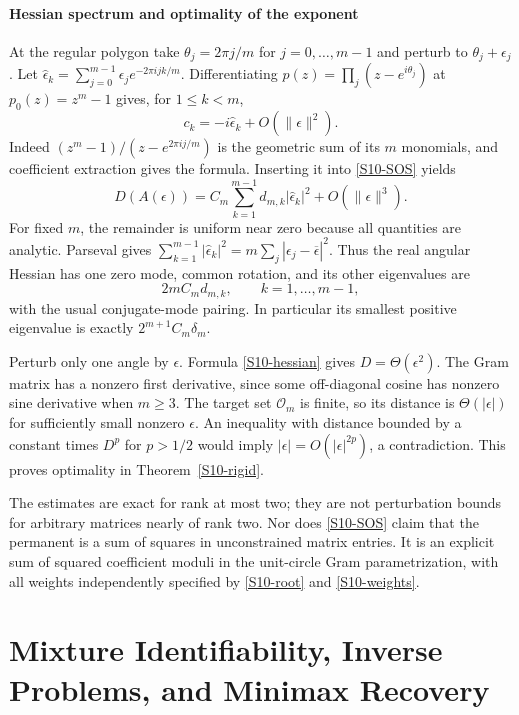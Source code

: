 \documentclass[11pt,a4paper]{article}
\theoremstyle{definition}\newtheorem{definition}[theorem]{Definition}
\theoremstyle{remark}\newtheorem{remark}[theorem]{Remark}
\numberwithin{equation}{section}
\begin{document}
\subsection{Hessian spectrum and optimality of the exponent}\label{S10-sec-5}
At the regular polygon take $\theta_j=2\pi j/m$ for $j=0,\ldots,m-1$ and perturb to $\theta_j+\epsilon_j$. Let
$\widehat\epsilon_k=\sum_{j=0}^{m-1}\epsilon_j e^{-2\pi i jk/m}$.
Differentiating $p(z)=\prod_j(z-e^{i\theta_j})$ at $p_0(z)=z^m-1$ gives, for $1\le k<m$,
\[
 c_k=-i\widehat\epsilon_k+O(\|\epsilon\|^2).
\]
Indeed $(z^m-1)/(z-e^{2\pi ij/m})$ is the geometric sum of its $m$ monomials, and coefficient extraction gives the formula. Inserting it into \eqref{S10-SOS} yields
\begin{equation}\label{S10-hessian}
 D(A(\epsilon))=C_m\sum_{k=1}^{m-1}d_{m,k}|\widehat\epsilon_k|^2
 +O(\|\epsilon\|^3).
\end{equation}
For fixed $m$, the remainder is uniform near zero because all quantities are analytic. Parseval gives $\sum_{k=1}^{m-1}|\widehat\epsilon_k|^2=m\sum_j|\epsilon_j-\overline\epsilon|^2$. Thus the real angular Hessian has one zero mode, common rotation, and its other eigenvalues are
\[
 2mC_md_{m,k},\qquad k=1,\ldots,m-1,
\]
with the usual conjugate-mode pairing. In particular its smallest positive eigenvalue is exactly $2^{m+1}C_m\delta_m$.

Perturb only one angle by $\epsilon$. Formula \eqref{S10-hessian} gives $D=\Theta(\epsilon^2)$. The Gram matrix has a nonzero first derivative, since some off-diagonal cosine has nonzero sine derivative when $m\ge3$. The target set $\mathcal O_m$ is finite, so its distance is $\Theta(|\epsilon|)$ for sufficiently small nonzero $\epsilon$. An inequality with distance bounded by a constant times $D^p$ for $p>1/2$ would imply $|\epsilon|=O(|\epsilon|^{2p})$, a contradiction. This proves optimality in Theorem~\ref{S10-rigid}.

The estimates are exact for rank at most two; they are not perturbation bounds for arbitrary matrices nearly of rank two. Nor does \eqref{S10-SOS} claim that the permanent is a sum of squares in unconstrained matrix entries. It is an explicit sum of squared coefficient moduli in the unit-circle Gram parametrization, with all weights independently specified by \eqref{S10-root} and \eqref{S10-weights}.




\clearpage
\part{Mixture Identifiability, Inverse Problems, and Minimax Recovery}
\end{document}
